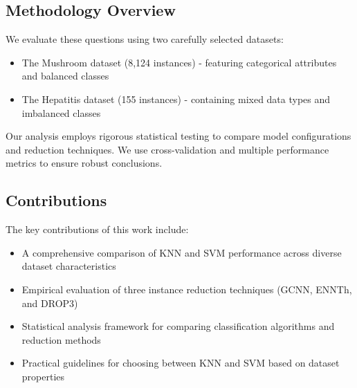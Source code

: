 \subsection{Methodology Overview}

We evaluate these questions using two carefully selected datasets:
\begin{itemize}
    \item The Mushroom dataset (8,124 instances) - featuring categorical attributes and balanced classes
    \item The Hepatitis dataset (155 instances) - containing mixed data types and imbalanced classes
\end{itemize}

Our analysis employs rigorous statistical testing to compare model configurations and reduction techniques. We use cross-validation and multiple performance metrics to ensure robust conclusions.

\subsection{Contributions}

The key contributions of this work include:
\begin{itemize}
    \item A comprehensive comparison of KNN and SVM performance across diverse dataset characteristics
    \item Empirical evaluation of three instance reduction techniques (GCNN, ENNTh, and DROP3)
    \item Statistical analysis framework for comparing classification algorithms and reduction methods
    \item Practical guidelines for choosing between KNN and SVM based on dataset properties
\end{itemize}